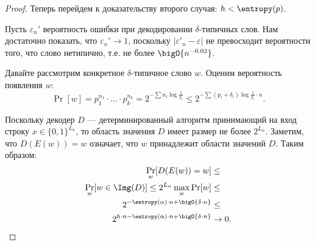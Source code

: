 \begin{proof}
    Теперь перейдем к доказательству второго случая: $h < \entropy(p)$.
    
    Пусть $\varepsilon_n'$ вероятность ошибки при декодировании $\delta$-типичных слов. Нам достаточно
    показать, что $\varepsilon_n' \to 1$, поскольку $|\varepsilon'_n - \varepsilon|$ не 
    превосходит вероятности того, что слово нетипично, т.е. не более $\bigO{n^{-0.02}}$.
    
    Давайте рассмотрим конкретное $\delta$-типичное слово $w$. Оценим вероятность появления $w$:
    $$
        \Pr[w] = p_1^{n_1} \cdot \dots \cdot p_k^{n_k}
        = 2^{-\sum n_i \log\frac{1}{p_i}} \le 2^{-\sum (p_i + \delta_i) \log\frac{1}{p_i} \cdot n}.
    $$

    Поскольку декодер $D$ --- детерминированный алгоритм принимающий на вход строку $x \in \{0,
    1\}^{L_n}$, то область значения $D$ имеет размер не более $2^{L_n}$. Заметим, что $D(E(w)) = w$
    означает, что $w$ принадлежит области значений $D$. Таким образом:
    \begin{align*}
      \Pr\limits_{w}[D(E(w)) = w] &\le \\
      \Pr\limits_{w}[w \in \Img(D)] \le 2^{L_n} \max_{w} \Pr[w] &\le \\
      2^{-\entropy(\alpha) \cdot n + \bigO{\delta \cdot n}} &\le \\
      2^{h \cdot n - \entropy(\alpha) \cdot n + \bigO{\delta \cdot n}} &\to 0.
    \end{align*}
\end{proof}
